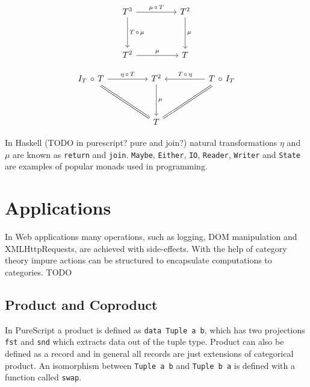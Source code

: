 \documentclass[article]{aaltoseries}
\begin{document}
    \begin{equation}
      \label{associativity}
      \begin{tikzcd}[row sep=huge, column sep=huge]
        T^3 \arrow[r, "\mu\, \circ\, T"]
        \arrow[d, "T\, \circ\, \mu"]
        & T^2 \arrow[d, "\mu"] \\
        T^2 \arrow[r, "\mu"]
        & T
      \end{tikzcd}
    \end{equation}

    \begin{equation}
      \label{identity}
      \begin{tikzcd}[row sep=huge, column sep=huge]
        I_T\, \circ\, T
        \arrow[r, "\eta\, \circ\, T"]
        \arrow[dr, equal]
        & T^2
        \arrow[d, "\mu"]
        & T\, \circ\, I_T
        \arrow[l, "T\, \circ\, \eta"{above}]
        \arrow[dl, equal] \\
        {}
        & T
        &
      \end{tikzcd}
    \end{equation}

    In Haskell (TODO in purescript? pure and join?) natural transformations $\eta$ and $\mu$ are known as
    \lstinline|return| and \lstinline|join|. \lstinline|Maybe|,
    \lstinline|Either|, \lstinline|IO|, \lstinline|Reader|, \lstinline|Writer|
    and \lstinline|State| are examples of popular monads used in programming.



\section{Applications}

In Web applications many operations, such as logging, DOM manipulation and
XMLHttpRequests, are achieved with side-effects. With the help of category
theory impure actions can be structured to encapsulate computations to
categories. TODO

  \subsection{Product and Coproduct}
    In PureScript a product is defined as \lstinline|data Tuple a b|, which has
    two projections \lstinline|fst| and \lstinline|snd| which extracts data out
    of the tuple type. Product can also be defined as a record and in general
    all records are just extensions of categorical product. An isomorphism
    between \lstinline|Tuple a b| and \lstinline|Tuple b a| is defined with a
    function called \lstinline|swap|.
    
\end{document}
